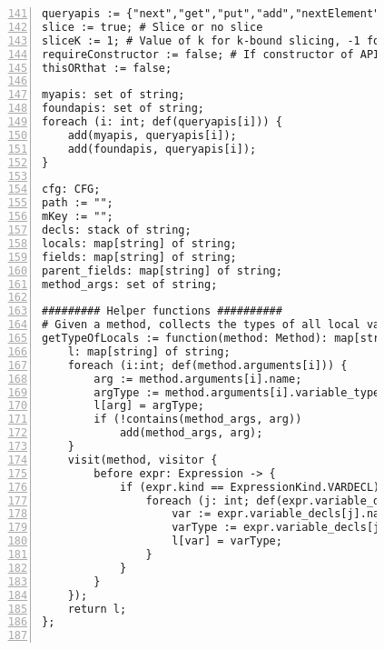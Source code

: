 \begin{figure}[ht!]
\begin{lstlisting}[numbers=left, tabsize=4, escapechar=@, caption={API Usage Mining Analysis},label={lst:aun-code},  firstline = 141, firstnumber = 141, lastline = 201]
queryapis := {"next","get","put","add","nextElement","elementAt","size","remove","nextToken","toArray","getString","group","getProperty","iterator","addElement","info","compile","containsKey","matcher","setProperty","contains","fine","set","keySet","addAll","nextInt","log","entrySet","pop","warning","asList","getTime","push","indexOf","subList","fill","values","clear","getTimeZone","hasNext","getBundle","sort","finest","getLogger","end","start","store","removeElementAt","setTime","removeFirst","severe","finer","copyInto","getKey","peek","insertElementAt","hasMoreTokens","getValue","getName","previous","compare","getBoolean","isEmpty","copyOf","load","elements","getInputStream","getInt","schedule","removeElement","firstElement","appendReplacement","userNodeForPackage","setElementAt","putAll","unmodifiableList","replaceAll","write","split","nextLine","hasMoreElements","after","noneOf","removeLast","before","removeAll","listIterator","addLast","cancel","groupCount","putInt","equals","addFirst","toString","singleton","singletonList","node","getFirst","matches","keys","putBoolean","getLast","copyOfRange","binarySearch","compareTo","isDirectory","scheduleAtFixedRate","nextSetBit","hashCode","setTimeInMillis","config","allOf","getLanguage","poll","find","entering","first","setSize","lastElement","replaceFirst","compareAndSet","putIfAbsent"}; # API methods
slice := true; # Slice or no slice
sliceK := 1; # Value of k for k-bound slicing, -1 for infinity
requireConstructor := false; # If constructor of API class are of interest
thisORthat := false;

myapis: set of string;
foundapis: set of string;
foreach (i: int; def(queryapis[i])) {
    add(myapis, queryapis[i]);   
    add(foundapis, queryapis[i]);
}

cfg: CFG;
path := "";
mKey := "";
decls: stack of string;
locals: map[string] of string;
fields: map[string] of string;
parent_fields: map[string] of string;
method_args: set of string;

######### Helper functions ##########
# Given a method, collects the types of all local variables including method parameters
getTypeOfLocals := function(method: Method): map[string] of string {
    l: map[string] of string;
    foreach (i:int; def(method.arguments[i])) {
        arg := method.arguments[i].name;
        argType := method.arguments[i].variable_type.name;
        l[arg] = argType;
        if (!contains(method_args, arg))
            add(method_args, arg);
    }
    visit(method, visitor {
        before expr: Expression -> {            
            if (expr.kind == ExpressionKind.VARDECL) {
                foreach (j: int; def(expr.variable_decls[j])) {
                    var := expr.variable_decls[j].name;
                    varType := expr.variable_decls[j].variable_type.name;
                    l[var] = varType;
                }
            }
        }
    });
    return l;
};


\end{lstlisting}
\end{figure}
